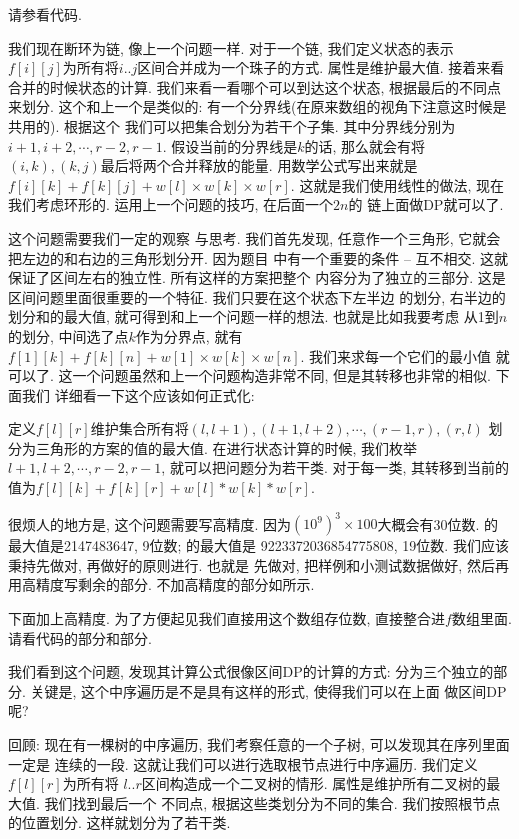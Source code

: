 请参看代码. 

 我们现在断环为链, 像上一个问题一样. 对于一个链, 我们定义状态的表示
$f[i][j]$为所有将$i..j$区间合并成为一个珠子的方式. 属性是维护最大值. 接着来看
合并的时候状态的计算. 我们来看一看哪个可以到达这个状态, 根据最后的不同点来划分. 
这个和上一个是类似的: 有一个分界线(在原来数组的视角下注意这时候是共用的). 根据这个
我们可以把集合划分为若干个子集. 其中分界线分别为$i+1, i+2, \cdots, r-2, r-1$.
假设当前的分界线是$k$的话, 那么就会有将$(i, k), (k, j)$最后将两个合并释放的能量. 
用数学公式写出来就是$f[i][k] + f[k][j] + w[l]\times w[k]\times w[r]$. 
这就是我们使用线性的做法, 现在我们考虑环形的. 运用上一个问题的技巧, 在后面一个$2n$的
链上面做DP就可以了. 

 这个问题需要我们一定的观察
与思考. 我们首先发现, 任意作一个三角形, 它就会把左边的和右边的三角形划分开. 因为题目
中有一个重要的条件 -- 互不相交. 这就保证了区间左右的独立性. 所有这样的方案把整个
内容分为了独立的三部分. 这是区间问题里面很重要的一个特征. 我们只要在这个状态下左半边
的划分, 右半边的划分和的最大值, 就可得到和上一个问题一样的想法. 也就是比如我要考虑
从1到$n$的划分, 中间选了点$k$作为分界点, 就有
$f[1][k]+f[k][n]+w[1]\times w[k] \times w[n]$. 我们来求每一个它们的最小值
就可以了. 这一个问题虽然和上一个问题构造非常不同, 但是其转移也非常的相似. 下面我们
详细看一下这个应该如何正式化: 

定义$f[l][r]$维护集合所有将$(l,l+1), (l+1, l+2), \cdots , (r-1, r), (r,l)$
划分为三角形的方案的值的最大值. 在进行状态计算的时候, 我们枚举$l+1, l+2,\cdots, r-2,
r-1$, 就可以把问题分为若干类. 对于每一类, 其转移到当前的值为$f[l][k]+f[k][r]+w[l]*w[k]*w[r]$.

很烦人的地方是, 这个问题需要写高精度. 因为$(10^9)^3\times100$大概会有30位数. 
的最大值是2147483647, 9位数; 的最大值是 
9223372036854775808, 19位数.  
我们应该秉持先做对, 再做好的原则进行. 也就是
先做对, 把样例和小测试数据做好, 然后再用高精度写剩余的部分. 
不加高精度的部分如所示. 

下面加上高精度. 为了方便起见我们直接用这个数组存位数, 直接整合进$f$数组里面. 
请看代码的部分和部分. 

 我们看到这个问题, 发现其计算公式很像区间DP的计算的方式: 
分为三个独立的部分. 关键是, 这个中序遍历是不是具有这样的形式, 使得我们可以在上面
做区间DP呢? 

回顾: 现在有一棵树的中序遍历, 我们考察任意的一个子树, 可以发现其在序列里面一定是
连续的一段. 这就让我们可以进行选取根节点进行中序遍历. 我们定义$f[l][r]$为所有将
$l..r$区间构造成一个二叉树的情形. 属性是维护所有二叉树的最大值. 我们找到最后一个
不同点, 根据这些类划分为不同的集合. 我们按照根节点的位置划分. 这样就划分为了若干类.

